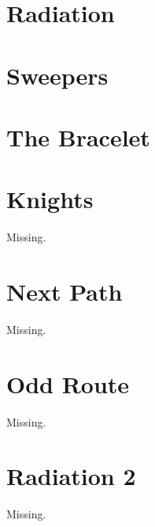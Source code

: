\documentclass[a4paper, 10pt]{article}
\let\stdsection\section
\renewcommand\section{\newpage\stdsection}
\newcommand{\includecode}[1]{
    }
\newcommand{\algoAuthor}{2} %
\begin{document}
    \section{Radiation}
        \includecode{../problems/w12/Radiation/Radiation\algoAuthor.cpp}
        
    \section{Sweepers}
        \includecode{../problems/w12/Sweepers/Sweepers\algoAuthor.cpp}
        
    \section{The Bracelet}
        \includecode{../problems/w12/The_Bracelet/TheBracelet\algoAuthor.cpp}
        
    
    \section{Knights}
        Missing.
        
    \section{Next Path}
        Missing.
        
    \section{Odd Route}
        Missing.
        \includecode{../problems/w13/OddRoute/OddRoute\algoAuthor.cpp}
        
    \section{Radiation 2}
        Missing.
    
\end{document}
